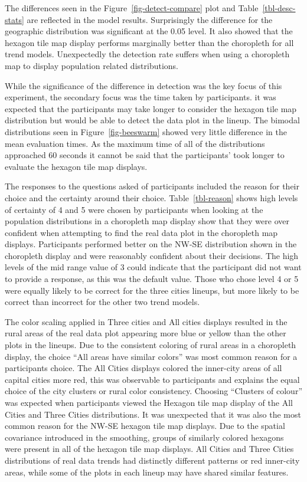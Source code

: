 \documentclass[
doublespace,
  times]{anzsauth}
\begin{document}
The differences seen in the Figure~\ref{fig-detect-compare} plot and
Table~\ref{tbl-desc-stats} are reflected in the model results.
Surprisingly the difference for the geographic distribution was
significant at the 0.05 level. It also showed that the hexagon tile map
display performs marginally better than the choropleth for all trend
models. Unexpectedly the detection rate suffers when using a choropleth
map to display population related distributions.

While the significance of the difference in detection was the key focus
of this experiment, the secondary focus was the time taken by
participants. it was expected that the participants may take longer to
consider the hexagon tile map distribution but would be able to detect
the data plot in the lineup. The bimodal distributions seen in
Figure~\ref{fig-beeswarm} showed very little difference in the mean
evaluation times. As the maximum time of all of the distributions
approached 60 seconds it cannot be said that the participants' took
longer to evaluate the hexagon tile map displays.

The responses to the questions asked of participants included the reason
for their choice and the certainty around their choice.
Table~\ref{tbl-reason} shows high levels of certainty of 4 and 5 were
chosen by participants when looking at the population distributions in a
choropleth map display show that they were over confident when
attempting to find the real data plot in the choropleth map displays.
Participants performed better on the NW-SE distribution shown in the
choropleth display and were reasonably confident about their decisions.
The high levels of the mid range value of 3 could indicate that the
participant did not want to provide a response, as this was the default
value. Those who chose level 4 or 5 were equally likely to be correct
for the three cities lineups, but more likely to be correct than
incorrect for the other two trend models.

The color scaling applied in Three cities and All cities displays
resulted in the rural areas of the real data plot appearing more blue or
yellow than the other plots in the lineups. Due to the consistent
coloring of rural areas in a choropleth display, the choice ``All areas
have similar colors'' was most common reason for a participants choice.
The All Cities displays colored the inner-city areas of all capital
cities more red, this was observable to participants and explains the
equal choice of the city clusters or rural color consistency. Choosing
``Clusters of colour'' was expected when participants viewed the Hexagon
tile map display of the All Cities and Three Cities distributions. It
was unexpected that it was also the most common reason for the NW-SE
hexagon tile map displays. Due to the spatial covariance introduced in
the smoothing, groups of similarly colored hexagons were present in all
of the hexagon tile map displays. All Cities and Three Cities
distributions of real data trends had distinctly different patterns or
red inner-city areas, while some of the plots in each lineup may have
shared similar features.
\end{document}
